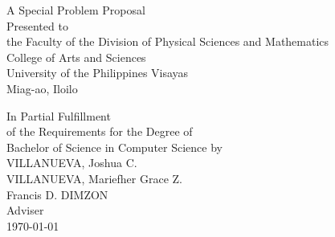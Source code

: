 \begin{titlepage}
\centering


\vspace{1.75cm}
A Special Problem Proposal\\
Presented to\\
the Faculty of the Division of Physical Sciences and Mathematics\\
College of Arts and Sciences\\
University of the Philippines Visayas\\
Miag-ao, Iloilo

\vspace{1.75cm}
In Partial Fulfillment\\
of the Requirements for the Degree of\\
Bachelor of Science in Computer Science
\vspace{1.75cm}
by\\

\vspace{1cm}
VILLANUEVA, Joshua C.  \\
VILLANUEVA, Mariefher Grace Z.  \\


\vspace{1cm}
Francis D. DIMZON \\
Adviser\\

\vspace{1.75cm}
\today
\end{titlepage}